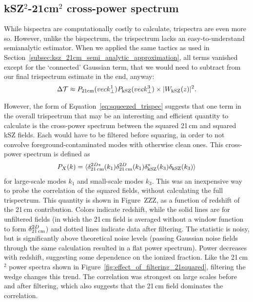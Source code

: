 \subsection{kSZ$^2$-21cm$^2$ cross-power spectrum}

While bispectra are computationally costly to calculate, trispectra are even more so. However, unlike the bispectrum, the trispectrum lacks an easy-to-understand semianalytic estimator. When we applied the same tactics as used in Section~\ref{subsec:ksz_21cm_semi_analytic_approximation}, all terms vanished except for the `connected' Gaussian term, that we would need to subtract from our final trispectrum estimate in the end, anyway:
\begin{equation}
\Delta\mathcal{T} \approx P_{\rm 21cm}(vec{k}^1_{\perp})P_{\rm kSZ}(vec{k}^3_{\perp}) \times |W_{\rm kSZ}(z)|^2.
\end{equation}

However, the form of Equation~\ref{eq:squeezed_trispec} suggests that one term in the overall trispectrum that may be an interesting and efficient quantity to calculate is the cross-power spectrum between the squared 21\,cm and squared kSZ fields. Each would have to be filtered before squaring, in order to not convolve foreground-contaminated modes with otherwise clean ones. This cross-power spectrum is defined as
\begin{equation}
P_X(k) = \langle \delta^{2D*}_{\rm 21\,cm}(k_1)\delta^{2D}_{\rm 21\,cm}(k_1) \delta^*_{\rm kSZ}(k_3) \delta_{\rm kSZ}(k_3) \rangle
\end{equation}
for large-scale modes $k_1$ and small-scale modes $k_3$. This was an inexpensive way to probe the correlation of the squared fields, without calculating the full trispectrum. This quantity is shown in Figure~ZZZ, as a function of redshift of the 21\,cm contribution. Colors indicate redshift, while the solid lines are for unfiltered fields (in which the 21\,cm field is averaged without a window function to form $\delta^{2D}_{\rm 21\,cm}$) and dotted lines indicate data after filtering. The statistic is noisy, but is significantly above theoretical noise levels (passing Gaussian noise fields through the same calculation resulted in a flat power spectrum). Power decreases with redshift, suggesting some dependence on the ionized fraction. Like the 21\,cm$^2$ power spectra shown in Figure~\ref{fig:effect_of_filtering_21squared}, filtering the wedge changes this trend. The correlation was strongest on large scales before and after filtering, which also suggests that the 21\,cm field dominates the correlation.

